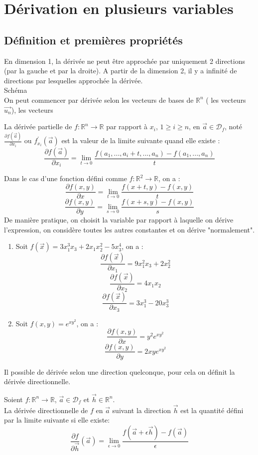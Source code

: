\chapter{Dérivation en plusieurs variables}
\section{Définition et premières propriétés}
 En dimension 1, la dérivée ne peut être approchée par uniquement 2 directions (par la gauche et par la droite).
 A partir de la dimension 2, il y a infinité de directions par lesquelles approchée la dérivée.\\
 \newline
 Schéma\\
On peut commencer par dérivée selon les vecteurs de bases de $\mathbb{R}^n$ ( les vecteurs $\overrightarrow{u_n}$), les vecteurs
\begin{defi}
    La dérivée partielle de $f:\mathbb{R}^n\to\mathbb{R}$ par rapport à $x_i$, $1\ge i\ge n$, en $\overrightarrow{a}\in\mathscr{D}_f$, noté $\frac{\partial f(\overrightarrow{a})}{\partial x_i}$ ou $f^{\prime}_{x_i}(\overrightarrow{a})$ est la valeur de la limite suivante quand elle existe :
    $$\frac{\partial f(\overrightarrow{a})}{\partial x_i}=\lim_{t\to 0}\frac{f(a_1,...,a_i+t,...,a_n)-f(a_1,...,a_n)}{t}$$
\end{defi}
Dans le cas d'une fonction défini comme $f:\mathbb{R}^2\to\mathbb{R}$, on a :\\
$$\frac{\partial f(x,y)}{\partial x} = \lim_{t\to 0}\frac{f(x+t,y)-f(x,y)}{t}$$
$$\frac{\partial f(x,y)}{\partial y} = \lim_{s\to 0}\frac{f(x+s,y)-f(x,y)}{s}$$
De manière pratique, on choisit la variable par rapport à laquelle on dérive l'expression, on considère toutes les autres constantes et on dérive "normalement".
\begin{ex}
\begin{enumerate}
    \item Soit $f(\overrightarrow{x})=3x_1^3x_3+2x_1x_2^2-5x_3^4$, on a :
    $$\frac{\partial f(\overrightarrow{x})}{\partial x_1} = 9x_1^2x_3+2x_2^2 $$
    $$\frac{\partial f(\overrightarrow{x})}{\partial x_2} = 4x_1x_2$$
    $$\frac{\partial f(\overrightarrow{x})}{\partial x_3} = 3x_1^3-20x_3^3$$
    \item Soit $f(x,y)=e^{xy^2}$, on a :
    $$\frac{\partial f(x,y)}{\partial x} = y^2e^{xy^2}$$
    $$\frac{\partial f(x,y)}{\partial y} = 2xye^{xy^2}$$
\end{enumerate}
\end{ex}
Il possible de dérivée selon une direction quelconque, pour cela on définit la dérivée directionnelle.
\begin{defi}
    Soient $f:\mathbb{R}^n\to\mathbb{R}$, $\overrightarrow{a}\in\mathscr{D}_f$ et $\overrightarrow{h}\in\mathbb{R}^n$.\\
    La dérivée directionnelle de $f$ en $\overrightarrow{a}$ suivant la direction $\overrightarrow{h}$ est la quantité défini par la limite suivante si elle existe:
    $$\frac{\partial f}{\partial\overrightarrow{h}}(\overrightarrow{a})=\lim_{\epsilon\to 0}\frac{f(\overrightarrow{a}+\epsilon\overrightarrow{h})-f(\overrightarrow{a})}{\epsilon}$$ 
    \newline
\end{defi}
